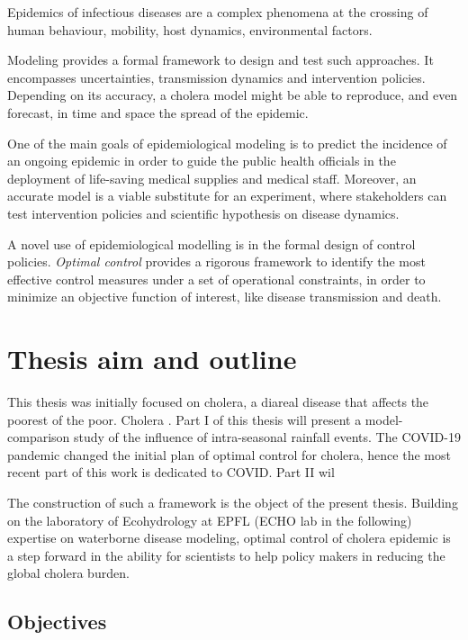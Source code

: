 Epidemics of infectious diseases are a complex phenomena at the crossing of human behaviour, mobility, host dynamics, environmental factors. 

Modeling provides a formal framework to design and test such approaches. It encompasses uncertainties, transmission dynamics and intervention policies. Depending on its accuracy, a cholera model might be able to reproduce, and even forecast, in time and space the spread of the epidemic.

One of the main goals of epidemiological modeling is to predict the incidence of an ongoing epidemic in order to guide the public health officials in the deployment of life-saving medical supplies and medical staff. Moreover, an accurate model is a viable substitute for an experiment, where stakeholders can test intervention policies and scientific hypothesis on disease dynamics.

A novel use of epidemiological modelling is in the formal design of control policies. \textit{Optimal control} provides a rigorous framework to identify the most effective control measures under a set of operational constraints, in order to minimize an objective function of interest, like disease transmission and death. 



\section{Thesis aim and outline}
This thesis was initially focused on cholera, a diareal disease that affects the poorest of the poor. Cholera . Part I of this thesis will present a model-comparison study of the influence of intra-seasonal rainfall events. The COVID-19 pandemic changed the initial plan of optimal control for cholera, hence the most recent part of this work is dedicated to COVID. Part II wil

The construction of such a framework is the object of the present thesis. Building on the laboratory of Ecohydrology at EPFL (ECHO lab in the following) expertise on waterborne disease modeling, optimal control of cholera epidemic is a step forward in the ability for scientists to help policy makers in reducing the global cholera burden.



\subsection{Objectives}


